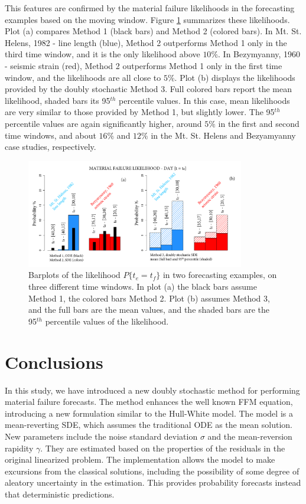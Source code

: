 \documentclass{article}
\begin{document}
This features are confirmed by the material failure likelihoods in the forecasting examples based on the moving window. Figure \ref{Fig16} summarizes these likelihoods. Plot (a) compares Method 1 (black bars) and Method 2 (colored bars). In Mt. St. Helens, 1982 - line length (blue), Method 2 outperforms Method 1 only in the third time window, and it is the only likelihood above $10\%$. In Bezymyanny, 1960 - seismic strain (red), Method 2 outperforms Method 1 only in the first time window, and the likelihoods are all close to $5\%$. Plot (b) displays the likelihoods provided by the doubly stochastic Method 3. Full colored bars report the mean likelihood, shaded bars its 95$^{th}$ percentile values. In this case, mean likelihoods are very similar to those provided by Method 1, but slightly lower. The 95$^{th}$ percentile values are again significantly higher, around $5\%$ in the first and second time windows, and about $16\%$ and $12\%$ in the Mt. St. Helens and Bezyamyanny case studies, respectively.

\begin{figure}[H]
\centering
\includegraphics[width=0.85\textwidth]{Fig16_plus.png}
\caption{Barplots of the likelihood $P\{t_e=t_f\}$ in two forecasting examples, on three different time windows. In plot (a) the black bars assume Method 1, the colored bars Method 2. Plot (b) assumes Method 3, and the full bars are the mean values, and the shaded bars are the 95$^{th}$ percentile values of the likelihood.}
\label{Fig16}
\end{figure}

\section{Conclusions}
In this study, we have introduced a new doubly stochastic method for performing material failure forecasts. The method enhances the well known FFM equation, introducing a new formulation similar to the Hull-White model. The model is a mean-reverting SDE, which assumes the traditional ODE as the mean solution. New parameters include the noise standard deviation $\sigma$ and the mean-reversion rapidity $\gamma$. They are estimated based on the properties of the residuals in the original linearized problem. The implementation allows the model to make excursions from the classical solutions, including the possibility of some degree of aleatory uncertainty in the estimation. This provides probability forecasts instead that deterministic predictions.
\end{document}

